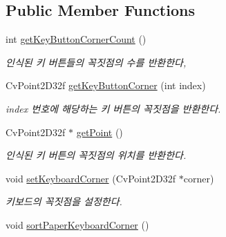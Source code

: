 \subsection*{Public Member Functions}
\begin{DoxyCompactItemize}
\item 
\hypertarget{class_fk_paper_keyboard_aa6409f89cad5029d37d4bc4a20a33c38}{}int \hyperlink{class_fk_paper_keyboard_aa6409f89cad5029d37d4bc4a20a33c38}{get\+Key\+Button\+Corner\+Count} ()\label{class_fk_paper_keyboard_aa6409f89cad5029d37d4bc4a20a33c38}

\begin{DoxyCompactList}\small\item\em 인식된 키 버튼들의 꼭짓점의 수를 반환한다, \end{DoxyCompactList}\item 
\hypertarget{class_fk_paper_keyboard_a997433ee676b99bcb80b6ba223ecbffc}{}Cv\+Point2\+D32f \hyperlink{class_fk_paper_keyboard_a997433ee676b99bcb80b6ba223ecbffc}{get\+Key\+Button\+Corner} (int index)\label{class_fk_paper_keyboard_a997433ee676b99bcb80b6ba223ecbffc}

\begin{DoxyCompactList}\small\item\em index 번호에 해당하는 키 버튼의 꼭짓점을 반환한다. \end{DoxyCompactList}\item 
\hypertarget{class_fk_paper_keyboard_a9765710e8049edf5778335ff0218ad33}{}Cv\+Point2\+D32f $\ast$ \hyperlink{class_fk_paper_keyboard_a9765710e8049edf5778335ff0218ad33}{get\+Point} ()\label{class_fk_paper_keyboard_a9765710e8049edf5778335ff0218ad33}

\begin{DoxyCompactList}\small\item\em 인식된 키 버튼의 꼭짓점의 위치를 반환한다. \end{DoxyCompactList}\item 
\hypertarget{class_fk_paper_keyboard_ab8c99e48a794169d9d620f559675c052}{}void \hyperlink{class_fk_paper_keyboard_ab8c99e48a794169d9d620f559675c052}{set\+Keyboard\+Corner} (Cv\+Point2\+D32f $\ast$corner)\label{class_fk_paper_keyboard_ab8c99e48a794169d9d620f559675c052}

\begin{DoxyCompactList}\small\item\em 키보드의 꼭짓점을 설정한다. \end{DoxyCompactList}\item 
\hypertarget{class_fk_paper_keyboard_a0c9fdd243955de537cbd2ebcf41c3232}{}void \hyperlink{class_fk_paper_keyboard_a0c9fdd243955de537cbd2ebcf41c3232}{sort\+Paper\+Keyboard\+Corner} ()\label{class_fk_paper_keyboard_a0c9fdd243955de537cbd2ebcf41c3232}


\end{DoxyCompactItemize}

